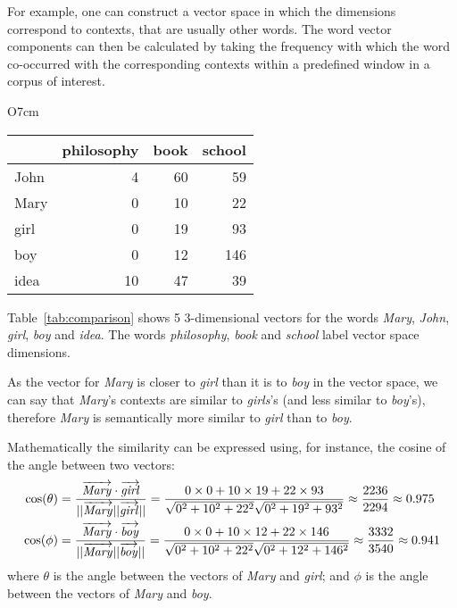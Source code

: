 For example, one can construct a vector space in which the dimensions correspond to contexts, that are usually other words. The word vector components can then be calculated by taking the frequency with which the word co-occurred with the corresponding contexts within a predefined window in a corpus of interest.

\begin{wraptable}[10]{O}{7cm}
  \centering
  \begin{tabular}{lrrr}
    \toprule
    & philosophy & book & school \\
    \midrule
    John & 4  & 60 & 59  \\
    Mary & 0  & 10 & 22  \\
    girl & 0  & 19 & 93  \\
    boy  & 0  & 12 & 146 \\
    idea & 10 & 47 & 39  \\
    \bottomrule
  \end{tabular}
  \caption{Word co-occurrence frequencies extracted from the BNC.}
  \label{tab:comparison}
\end{wraptable}

Table~\ref{tab:comparison} shows 5 3-dimensional vectors for the words \textit{Mary}, \textit{John}, \textit{girl}, \textit{boy} and \textit{idea}. The words \textit{philosophy}, \textit{book} and \textit{school} label vector space dimensions.

As the vector for \textit{Mary} is closer to \textit{girl} than it is to \textit{boy} in the vector space, we can say that \textit{Mary}'s contexts are similar to \textit{girls}'s (and less similar to \textit{boy}'s), therefore \textit{Mary} is semantically more similar to \textit{girl} than to \textit{boy}.

Mathematically the similarity can be expressed using, for instance, the cosine of the angle between two vectors:
%
\begin{align*}
\cos(\theta) &=
\frac{\ov{\mathit{Mary}}\cdot\ov{\mathit{girl}}}
{||\ov{\mathit{Mary}}||\ov{\mathit{girl}}||} =
%
\frac{0\times0 + 10\times19 + 22\times93}
{\sqrt{0^2 + 10^2 + 22^2}\sqrt{0^2 + 19^2 + 93^2}} \approx
\frac{2236}{2294} \approx 0.975
 \\
\cos(\phi) &=
\frac{\ov{\mathit{Mary}}\cdot\ov{\mathit{boy}}}
{||\ov{\mathit{Mary}}||\ov{\mathit{boy}}||} =
%
\frac{0\times0 + 10\times12 + 22\times146}
{\sqrt{0^2 + 10^2 + 22^2}\sqrt{0^2 + 12^2 + 146^2}} \approx
\frac{3332}{3540} \approx 0.941
\end{align*}
%
where $\theta$ is the angle between the vectors of \textit{Mary} and \textit{girl}; and $\phi$ is the angle between the vectors of \textit{Mary} and \textit{boy}.

